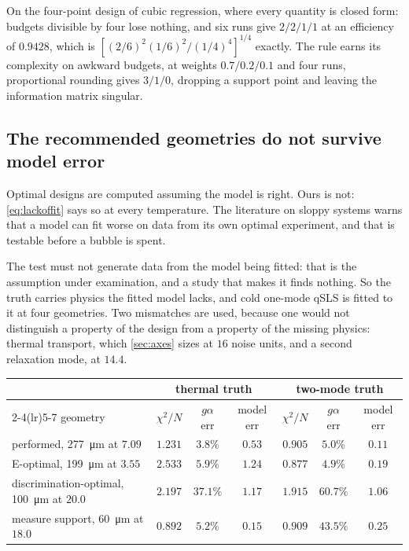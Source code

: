 \documentclass[10pt]{article}
\begin{document}
On the four-point design of cubic regression, where every quantity is closed form: budgets
divisible by four lose nothing, and six runs give $2/2/1/1$ at an efficiency of $0.9428$, which
is $\left[(2/6)^2(1/6)^2/(1/4)^4\right]^{1/4}$ exactly. The rule earns its complexity on
awkward budgets, at weights $0.7/0.2/0.1$ and four runs, proportional rounding gives
$3/1/0$, dropping a support point and leaving the information matrix singular.

\subsection*{The recommended geometries do not survive model error}

Optimal designs are computed assuming the model is right. Ours is not: \eqref{eq:lackoffit}
says so at every temperature. The literature on sloppy systems warns that a model can fit worse
on data from its own optimal experiment, and that is testable before a bubble is spent.

The test must not generate data from the model being fitted: that is the assumption under
examination, and a study that makes it finds nothing. So the truth carries physics the fitted
model lacks, and cold one-mode qSLS is fitted to it at four geometries. Two mismatches are
used, because one would not distinguish a property of the design from a property of the
missing physics: thermal transport, which \cref{sec:axes} sizes at $16$ noise units, and a
second relaxation mode, at $14.4$.

\begin{center}
\begin{tabular}{lcccccc}
\toprule
& \multicolumn{3}{c}{thermal truth} & \multicolumn{3}{c}{two-mode truth} \\
\cmidrule(lr){2-4}\cmidrule(lr){5-7}
geometry & $\chi^2/N$ & $g\alpha$ err & model err & $\chi^2/N$ & $g\alpha$ err & model err \\
\midrule
performed, \SI{277}{\micro\metre} at $7.09$ & $1.231$ & $\mathbf{3.8\%}$ & $0.53$ & $0.905$ & $5.0\%$ & $\mathbf{0.11}$ \\
E-optimal, \SI{199}{\micro\metre} at $3.55$ & $2.533$ & $5.9\%$ & $1.24$ & $0.877$ & $4.9\%$ & $0.19$ \\
discrimination-optimal, \SI{100}{\micro\metre} at $20.0$ & $2.197$ & $\mathbf{37.1\%}$ & $1.17$ & $1.915$ & $\mathbf{60.7\%}$ & $1.06$ \\
measure support, \SI{60}{\micro\metre} at $18.0$ & $0.892$ & $5.2\%$ & $0.15$ & $0.909$ & $\mathbf{43.5\%}$ & $0.25$ \\
\bottomrule
\end{tabular}
\end{center}
\end{document}
